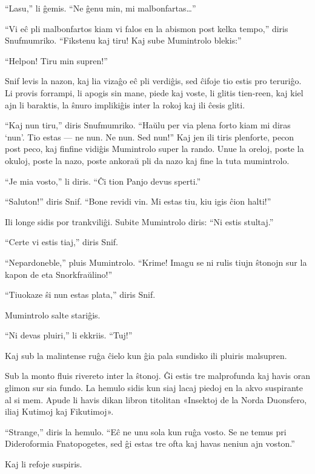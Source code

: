 ``Lasu,'' li ĝemis. ``Ne ĝenu min, mi malbonfartas{\ldots}''

``Vi eĉ pli malbonfartos kiam vi falos en la abismon post kelka tempo,'' diris Snufmumriko. ``Fikstenu kaj tiru! Kaj sube Mumintrolo blekis:''

``Helpon! Tiru min supren!''

Snif levis la nazon, kaj lia vizaĝo eĉ pli verdiĝis, sed ĉifoje tio estis pro teruriĝo. Li provis forrampi, li apogis sin mane, piede kaj voste, li glitis tien-reen, kaj kiel ajn li baraktis, la ŝnuro implikiĝis inter la rokoj kaj ili ĉesis gliti.

``Kaj nun tiru,'' diris Snufmumriko. ``Haŭlu per via plena forto kiam mi diras `nun'. Tio estas --- ne nun. Ne nun. Sed nun!'' Kaj jen ili tiris plenforte, pecon post peco, kaj finfine vidiĝis Mumintrolo super la rando. Unue la oreloj, poste la okuloj, poste la nazo, poste ankoraŭ pli da nazo kaj fine la tuta mumintrolo.

``Je mia vosto,'' li diris. ``Ĉi tion Panjo devus sperti.''

``Saluton!'' diris Snif. ``Bone revidi vin. Mi estas tiu, kiu igis ĉion halti!''

Ili longe sidis por trankviliĝi. Subite Mumintrolo diris: ``Ni estis stultaj.''

``Certe vi estis tiaj,'' diris Snif.

``Nepardoneble,'' pluis Mumintrolo. ``Krime! Imagu se ni rulis tiujn ŝtonojn sur la kapon de eta Snorkfraŭlino!''

``Tiuokaze ŝi nun estas plata,'' diris Snif.

Mumintrolo salte stariĝis.

``Ni devas pluiri,'' li ekkriis. ``Tuj!''

Kaj sub la malintense ruĝa ĉielo kun ĝia pala sundisko ili pluiris malsupren.

\sectionbreak

Sub la monto fluis rivereto inter la ŝtonoj. Ĝi estis tre malprofunda kaj havis oran glimon sur sia fundo. La hemulo sidis kun siaj lacaj piedoj en la akvo suspirante al si mem. Apude li havis dikan libron titolitan «Insektoj de la Norda Duonsfero, iliaj Kutimoj kaj Fikutimoj».

``Strange,'' diris la hemulo. ``Eĉ ne unu sola kun ruĝa vosto. Se ne temus pri Dideroformia Fnatopogetes, sed ĝi estas tre ofta kaj havas neniun ajn voston.''

Kaj li refoje suspiris.

